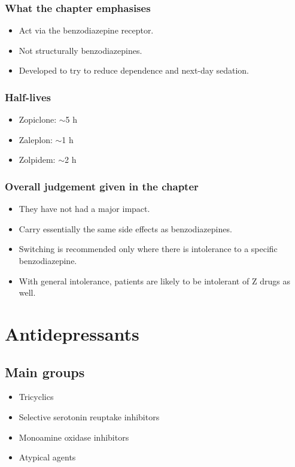 \documentclass[11pt,a4paper]{article}
\begin{document}
\subsubsection{What the chapter emphasises}
\begin{itemize}
  \item Act via the benzodiazepine receptor.
  \item Not structurally benzodiazepines.
  \item Developed to try to reduce dependence and next-day sedation.
\end{itemize}

\subsubsection{Half-lives}
\begin{itemize}
  \item Zopiclone: $\sim$5 h
  \item Zaleplon: $\sim$1 h
  \item Zolpidem: $\sim$2 h
\end{itemize}

\subsubsection{Overall judgement given in the chapter}
\begin{itemize}
  \item They have not had a major impact.
  \item Carry essentially the same side effects as benzodiazepines.
  \item Switching is recommended only where there is intolerance to a specific benzodiazepine.
  \item With general intolerance, patients are likely to be intolerant of Z drugs as well.
\end{itemize}

\section{Antidepressants}

\subsection{Main groups}
\begin{itemize}
  \item Tricyclics
  \item Selective serotonin reuptake inhibitors
  \item Monoamine oxidase inhibitors
  \item Atypical agents
\end{itemize}
\end{document}
